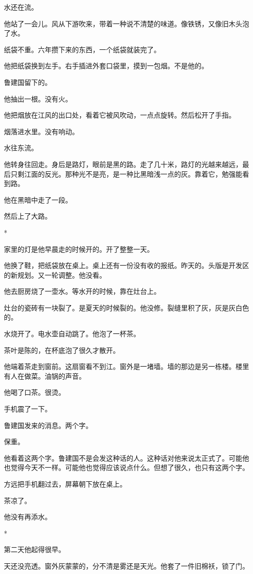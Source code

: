 \documentclass[UTF8,a5paper,11pt,openany]{ctexbook}
\newcommand{\scene}{\vspace{1em}\begin{center}*\quad*\quad*\end{center}\vspace{0.5em}}
\begin{document}
水还在流。

他站了一会儿。风从下游吹来，带着一种说不清楚的味道。像铁锈，又像旧木头泡了水。

纸袋不重。六年攒下来的东西，一个纸袋就装完了。

他把纸袋换到左手。右手插进外套口袋里，摸到一包烟。不是他的。

鲁建国留下的。

他抽出一根。没有火。

他把烟放在江风的出口处，看着它被风吹动，一点点旋转。然后松开了手指。

烟落进水里。没有响动。

水往东流。

他转身往回走。身后是路灯，眼前是黑的路。走了几十米，路灯的光越来越远，最后只剩江面的反光。那种光不是亮，是一种比黑暗浅一点的灰。靠着它，勉强能看到路。

他在黑暗中走了一段。

然后上了大路。


\scene

家里的灯是他早晨走的时候开的。开了整整一天。

他换了鞋，把纸袋放在桌上。桌上还有一份没有收的报纸。昨天的。头版是开发区的新规划。又一轮调整。他没看。

他去厨房烧了一壶水。等水开的时候，靠在灶台上。

灶台的瓷砖有一块裂了。是夏天的时候裂的。他没修。裂缝里积了灰，灰是灰白色的。

水烧开了。电水壶自动跳了。他泡了一杯茶。

茶叶是陈的，在杯底泡了很久才散开。

他端着茶走到窗前。这扇窗看不到江。窗外是一堵墙。墙的那边是另一栋楼。楼里有人在做菜。油锅的声音。

他喝了口茶。很烫。

手机震了一下。

鲁建国发来的消息。两个字。

保重。

他看着这两个字。鲁建国不是会发这种话的人。这种话对他来说太正式了。可能他也觉得今天不一样。可能他也觉得应该说点什么。但想了很久，也只有这两个字。

方远把手机翻过去，屏幕朝下放在桌上。

茶凉了。

他没有再添水。


\scene

第二天他起得很早。

天还没亮透。窗外灰蒙蒙的，分不清是雾还是天光。他套了一件旧棉袄，锁了门。
\end{document}
